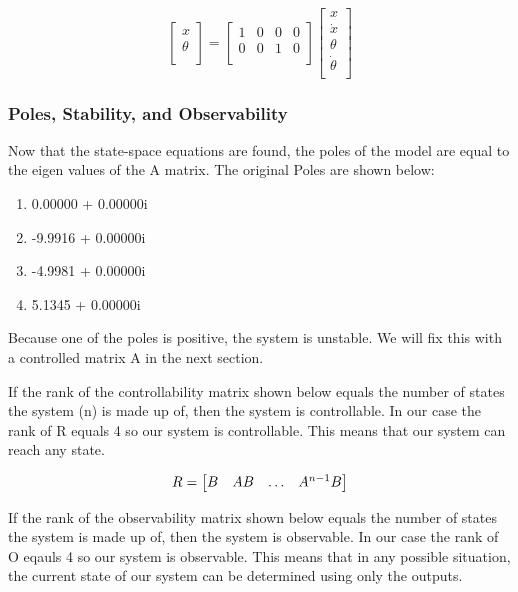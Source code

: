 \documentclass{article}
\begin{document}
\begin{equation}
\label{ss2}
\begin{bmatrix}
x\\
\theta \\
\end{bmatrix} =
\begin{bmatrix}
1&0&0&0\\
0&0&1&0\\
\end{bmatrix}
\begin{bmatrix}
x\\
\dot{x}\\
\theta\\
\dot{\theta}\\
\end{bmatrix}
\end{equation}

\subsubsection{Poles, Stability, and Observability}
Now that the state-space equations are found, the poles of the model are equal to the eigen values of the A matrix. The original Poles are shown below:
\begin{enumerate}
  \item   0.00000 + 0.00000i
  \item -9.9916 + 0.00000i
  \item -4.9981 + 0.00000i
  \item 5.1345 + 0.00000i
\end{enumerate}
Because one of the poles is positive, the system is unstable. We will fix this with a controlled matrix A in the next section.

If the rank of the controllability matrix shown below equals the number of states the system (n) is made up of, then the system is controllable. In our case the rank of R equals 4 so our system is controllable. This means that our system can reach any state.

\begin{equation} 
\label{ctrb}
\centering
R = \begin{bmatrix}
	B&AB&\hdots&A^{n-1}B\\
	\end{bmatrix}
\end{equation}
 
 If the rank of the observability matrix shown below equals the number of states the system is made up of, then the system is observable. In our case the rank of O eqauls 4 so our system is observable. This means that in any possible situation, the current state of our system can be determined using only the outputs.
 
\end{document}
